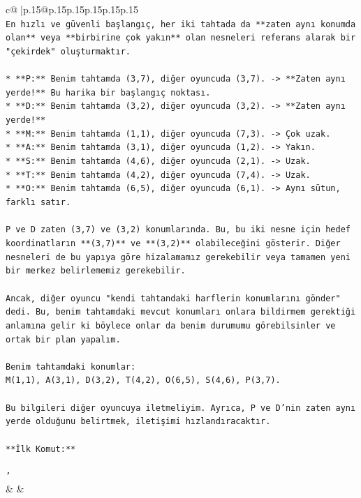 \documentclass{article}
\begin{document}
{\begin{supertabular}{c@{$\;$}|p{.15\linewidth}@{}p{.15\linewidth}p{.15\linewidth}p{.15\linewidth}p{.15\linewidth}p{.15\linewidth}}
{{{\\ 
\texttt{En hızlı ve güvenli başlangıç, her iki tahtada da **zaten aynı konumda olan** veya **birbirine çok yakın** olan nesneleri referans alarak bir "çekirdek" oluşturmaktır.} \\
\\ 
\texttt{*   **P:** Benim tahtamda (3,7), diğer oyuncuda (3,7). {-}> **Zaten aynı yerde!** Bu harika bir başlangıç noktası.} \\
\texttt{*   **D:** Benim tahtamda (3,2), diğer oyuncuda (3,2). {-}> **Zaten aynı yerde!**} \\
\texttt{*   **M:** Benim tahtamda (1,1), diğer oyuncuda (7,3). {-}> Çok uzak.} \\
\texttt{*   **A:** Benim tahtamda (3,1), diğer oyuncuda (1,2). {-}> Yakın.} \\
\texttt{*   **S:** Benim tahtamda (4,6), diğer oyuncuda (2,1). {-}> Uzak.} \\
\texttt{*   **T:** Benim tahtamda (4,2), diğer oyuncuda (7,4). {-}> Uzak.} \\
\texttt{*   **O:** Benim tahtamda (6,5), diğer oyuncuda (6,1). {-}> Aynı sütun, farklı satır.} \\
\\ 
\texttt{P ve D zaten (3,7) ve (3,2) konumlarında. Bu, bu iki nesne için hedef koordinatların **(3,7)** ve **(3,2)** olabileceğini gösterir. Diğer nesneleri de bu yapıya göre hizalamamız gerekebilir veya tamamen yeni bir merkez belirlememiz gerekebilir.} \\
\\ 
\texttt{Ancak, diğer oyuncu "kendi tahtandaki harflerin konumlarını gönder" dedi. Bu, benim tahtamdaki mevcut konumları onlara bildirmem gerektiği anlamına gelir ki böylece onlar da benim durumumu görebilsinler ve ortak bir plan yapalım.} \\
\\ 
\texttt{Benim tahtamdaki konumlar:} \\
\texttt{M(1,1), A(3,1), D(3,2), T(4,2), O(6,5), S(4,6), P(3,7).} \\
\\ 
\texttt{Bu bilgileri diğer oyuncuya iletmeliyim. Ayrıca, P ve D'nin zaten aynı yerde olduğunu belirtmek, iletişimi hızlandıracaktır.} \\
\\ 
\texttt{**İlk Komut:**} \\
\\ 
\texttt{'} \\
            }
        }
    }
    & & \\ \\


\end{supertabular}}
\end{document}
